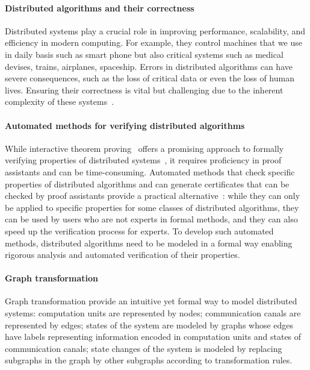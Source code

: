 \paragraph{Distributed algorithms and their correctness}
Distributed systems play a crucial role in improving performance, 
scalability, and efficiency in modern computing.
For example, they control machines that we use in daily basis such as smart phone but also critical systems such as medical devises, trains, airplanes, spaceship. Errors in distributed algorithms can have severe consequences, such as the loss of critical data or even the loss of human lives. 
Ensuring their correctness is vital but challenging due to the inherent complexity of these systems~\cite{heiser2010theroad, lamport2019thebyzantine}.

\paragraph{Automated methods for verifying distributed algorithms}
While interactive theorem proving~\cite{harrison2014history} offers a promising approach to formally verifying properties of distributed systems~\cite{plump2024formalisingDPO,potop2019formal,courtieu2016certified},  
it requires proficiency in proof assistants and can be
time-consuming. Automated methods that check specific properties of distributed algorithms and can generate certificates that can be checked by proof assistants provide a practical alternative~\cite{contejean2011automated,giesl2014proving}: while they can only be applied to specific properties for some classes of distributed algorithms, they can be used by users who are not experts in formal methods, and they can also speed up the verification process for experts. To develop such automated methods, distributed algorithms need to be modeled in a formal way enabling rigorous analysis and automated verification of their properties.


 \paragraph{Graph transformation}
 Graph transformation provide an intuitive yet formal way to model distributed systems: computation units are represented by nodes; communication canals are represented by edges; states of the system are modeled by graphs whose edges have labels representing information encoded in computation units and states of communication canals; state changes of the system is modeled by replacing subgraphs in the graph by other subgraphs according to transformation rules.

